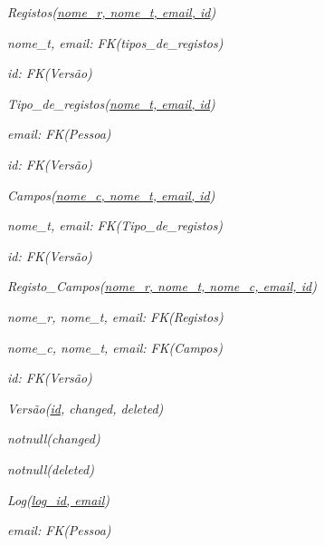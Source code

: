 \documentclass[11pt,a4paper]{article}
\begin{document}
\begin{description}[noitemsep]
	\item\textit{ Registos(\underline{nome\_r, nome\_t, email, id})}
	\item\textit{ nome\_t, email: FK(tipos\_de\_registos)}
	\item\textit{ id: FK(Vers\~{a}o)}
\end{description}

\begin{description}[noitemsep]
	\item\textit{ Tipo\_de\_registos(\underline{nome\_t, email, id})}
	\item\textit{ email: FK(Pessoa)}
	\item\textit{ id: FK(Vers\~{a}o)}
\end{description}
\newpage

\begin{description}[noitemsep]
	\item\textit{ Campos(\underline{nome\_c, nome\_t, email, id})}
	\item\textit{ nome\_t, email: FK(Tipo\_de\_registos)}
	\item\textit{ id: FK(Vers\~{a}o)}
\end{description}

\begin{description}[noitemsep]
	\item\textit{ Registo\_Campos(\underline{nome\_r, nome\_t, nome\_c, email, id})}
	\item\textit{ nome\_r, nome\_t, email: FK(Registos)}
	\item\textit{ nome\_c, nome\_t, email: FK(Campos)}
	\item\textit{ id: FK(Vers\~{a}o)}
\end{description}


\begin{description}[noitemsep]
	\item\textit{ Vers\~{a}o(\underline{id}, changed, deleted)}
	\item\textit{ notnull(changed)}
	\item\textit{ notnull(deleted)}
\end{description}

\begin{description}[noitemsep]
	\item\textit{ Log(\underline{log\_id, email})}
	\item\textit{ email: FK(Pessoa)}
\end{description}
\end{document}

